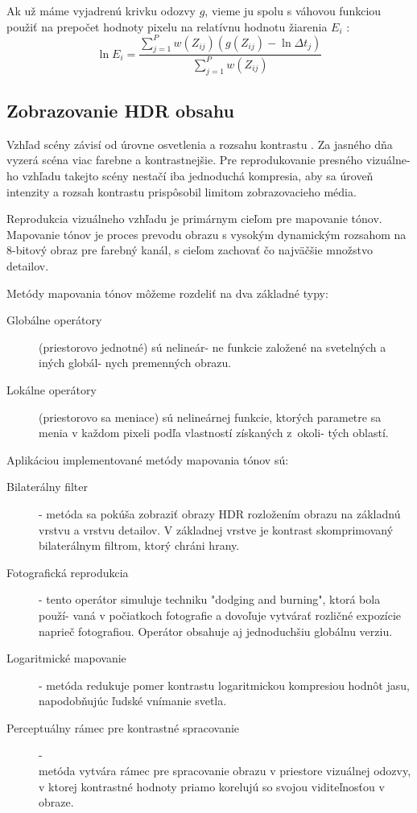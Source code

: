 \documentclass[slovak]{ExcelAtFIT}
\begin{document}
Ak už máme vyjadrenú krivku odozvy $g$, vieme ju spolu s váhovou funkciou použiť na prepočet hodnoty pixelu na relatívnu hodnotu žiarenia
$E_{i}$ \cite{Debevec}:
\begin{equation}
    \ln E_{i} = 
    \frac{
        \sum_{j=1}^{P}
        w(Z_{ij})(g(Z_{ij}) - \ln \Delta t_{j})
    }{
        \sum_{j=1}^{P}
        w(Z_{ij})
    }
\end{equation}

\subsection{Zobrazovanie HDR obsahu}
\label{sec:Theory-TMO}

Vzhľad scény závisí od úrovne osvetlenia a rozsahu kontrastu \cite{HDRI}. Za jasného dňa vyzerá scéna viac farebne a kontrastnejšie. Pre reprodukovanie
presného vizuálne- ho vzhľadu takejto scény nestačí iba jednoduchá kompresia, aby sa úroveň intenzity a rozsah kontrastu prispôsobil limitom zobrazovacieho
média.

Reprodukcia vizuálneho vzhľadu je primárnym cieľom pre mapovanie tónov.
Mapovanie tónov je proces prevodu obrazu s vysokým dynamickým rozsahom na 8-bitový obraz pre farebný kanál, s cieľom zachovať čo najväčšie množstvo detailov.

Metódy mapovania tónov môžeme rozdeliť na dva základné typy:
\begin{description}
    \item [Globálne operátory] (priestorovo jednotné) sú nelineár- ne funkcie založené na svetelných a iných
    globál- nych premenných obrazu. \cite{AHDR}
    \item [Lokálne operátory] (priestorovo sa meniace) sú nelineárnej funkcie, ktorých parametre sa menia
    v každom pixeli podľa vlastností získaných z~okoli- tých oblastí. \cite{AHDR}
\end{description}

Aplikáciou implementované metódy mapovania tónov sú:
\begin{description}
	\item [Bilaterálny filter] - metóda sa pokúša zobraziť obrazy HDR
    rozložením obrazu na základnú vrstvu a vrstvu detailov. V základnej vrstve je kontrast skomprimovaný
		bilaterálnym filtrom, ktorý chráni hrany. \cite{TMODurand}
	\item [Fotografická reprodukcia] - tento operátor simuluje techniku "dodging and burning", ktorá bola použí- vaná
    v počiatkoch fotografie a dovoľuje vytvárať rozličné expozície naprieč fotografiou. Operátor
		obsahuje aj jednoduchšiu globálnu verziu. \cite{TMOReinhard}
	\item [Logaritmické mapovanie] - metóda redukuje pomer kontrastu logaritmickou kompresiou hodnôt jasu,
    napodobňujúc ľudské vnímanie svetla. \cite{TMODrago}
	\item [Perceptuálny rámec pre kontrastné spracovanie] - \hfill \\ metóda vytvára rámec pre spracovanie obrazu
		v priestore vizuálnej odozvy, v ktorej kontrastné hodnoty priamo korelujú so svojou viditeľnosťou
		v obraze. \cite{TMOMantiuk}
\end{description}
\end{document}
